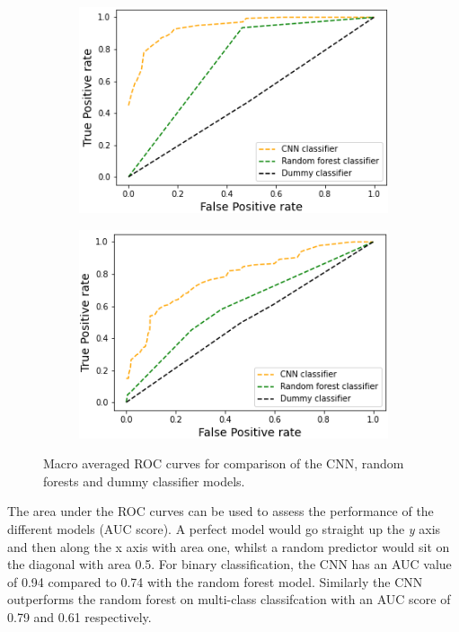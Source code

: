 \documentclass[conference]{IEEEtran}
\begin{document}
\begin{figure}[ht]
\begin{subfigure}[t]{0.24\textwidth}
  \centering
    \includegraphics[width=\textwidth]{Figures/ROC_binary_macro.png}
    \label{fig:binROC}
\end{subfigure}
\begin{subfigure}[t]{0.24\textwidth}
    \centering
    \includegraphics[width=\textwidth]{Figures/ROC_multiclass_macro.png}
    \label{fig:multiROC}
\end{subfigure}
\caption{Macro averaged ROC curves for comparison of the CNN, random forests and dummy classifier models.}
\label{fig:ROC}
\end{figure}
The area under the ROC curves can be used to assess the performance of the different models (AUC score). A perfect model would go straight up the \textit{y} axis and then along the x axis with area one, whilst a random predictor would sit on the diagonal with area 0.5. For binary classification, the CNN has an AUC value of 0.94 compared to 0.74 with the random forest model. Similarly the CNN outperforms the random forest on multi-class classifcation with an AUC score of 0.79 and 0.61 respectively.
\end{document}
